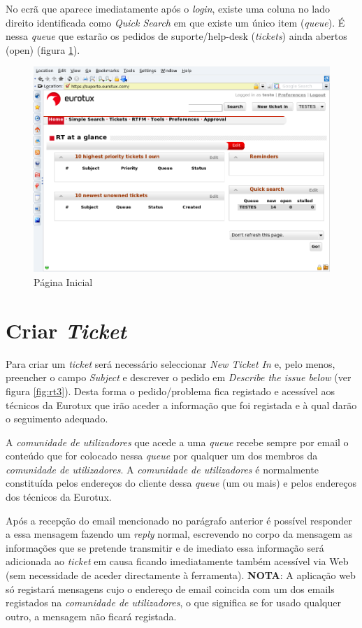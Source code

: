 No ecrã que aparece imediatamente após o \emph{login}, existe uma coluna no lado direito identificada como \emph{Quick Search} em que existe um único item (\emph{queue}).
É nessa \emph{queue} que estarão os pedidos de suporte/help-desk (\emph{tickets}) ainda abertos
(open) (figura \ref{fig:rt2}).

\begin{figure}[H]
\begin{center}
\includegraphics[width=16cm]{include/img/rt2}
\end{center}
\caption{Página Inicial}
\label{fig:rt2}
\end{figure}

\section{Criar \emph{Ticket}}
Para criar um \emph{ticket} será necessário seleccionar \emph{New Ticket In} e, pelo menos, preencher o campo \emph{Subject} e descrever o pedido em \emph{Describe the issue below} (ver figura \ref{fig:rt3}). Desta forma o pedido/problema fica registado e acessível aos técnicos da Eurotux que irão aceder a informação que foi registada e à qual darão o seguimento adequado.

A \emph{comunidade de utilizadores} que acede a uma \emph{queue} recebe sempre por email o conteúdo que for colocado nessa \emph{queue} por qualquer um dos membros da \emph{comunidade de utilizadores}. A \emph{comunidade de utilizadores} é normalmente constituída pelos endereços do cliente dessa \emph{queue} (um ou mais) e pelos endereços dos técnicos da Eurotux.

Após a recepção do email mencionado no parágrafo anterior é possível responder a essa mensagem fazendo um \emph{reply} normal, escrevendo no corpo da mensagem as informações que se pretende transmitir e de imediato essa informação será adicionada ao \emph{ticket} em causa ficando imediatamente também acessível via Web (sem necessidade de aceder directamente à ferramenta). \textbf{NOTA}: A aplicação web só registará mensagens cujo o endereço de email coincida com um dos emails registados na \emph{comunidade de utilizadores}, o que significa se for usado qualquer outro, a mensagem não ficará registada.

